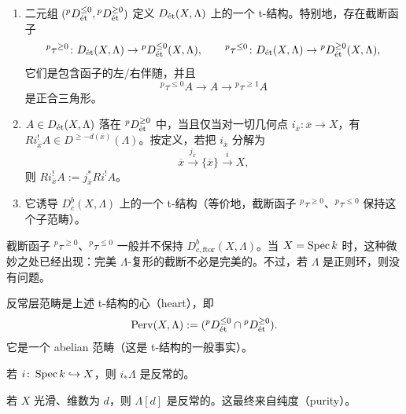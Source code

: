 \begin{theorem}
\begin{enumerate}[label=(\arabic*)]
\item 二元组 $({}^pD^{\le0}_\et,{}^pD^{\ge0}_\et)$ 定义 $D_\et(X,\Lambda)$ 上的一个 t-结构。特别地，存在截断函子
\[
{}^p\tau^{\ge0}\colon D_\et(X,\Lambda)\to{}^pD^{\le0}_\et(X,\Lambda),\qquad
{}^p\tau^{\le0}\colon D_\et(X,\Lambda)\to{}^pD^{\ge0}_\et(X,\Lambda),
\]
它们是包含函子的左/右伴随，并且
\[
{}^p\tau^{\le0}A\to A\to{}^p\tau^{\ge1}A
\]
是正合三角形。
\item $A\in D_\et(X,\Lambda)$ 落在 ${}^pD^{\ge0}_\et$ 中，当且仅当对一切几何点 $i_{\overline{x}}\colon\overline{x}\to X$，有 $Ri^!_{\overline{x}}A\in D^{\ge -d(\overline{x})}(\Lambda)$。按定义，若把 $i_{\overline{x}}$ 分解为
\[
\overline{x}\xrightarrow{j_{\overline{x}}}\{\overline{x}\}\xrightarrow{i}X,
\]
则 $Ri^!_{\overline{x}}A:=j^*_{\overline{x}}Ri^!A$。
\item 它诱导 $D^b_c(X,\Lambda)$ 上的一个 t-结构（等价地，截断函子 ${}^p\tau^{\ge0}$、${}^p\tau^{\le0}$ 保持这个子范畴）。
\end{enumerate}
\end{theorem}

\begin{warning}
截断函子 ${}^p\tau^{\ge0}$、${}^p\tau^{\le0}$ 一般并不保持 $D^b_{c,\mathrm{ftor}}(X,\Lambda)$。当 $X=\Spec k$ 时，这种微妙之处已经出现：完美 $\Lambda$-复形的截断不必是完美的。不过，若 $\Lambda$ 是正则环，则没有问题。
\end{warning}

\begin{definition}
反常层范畴是上述 t-结构的心（heart），即
\[
\Perv(X,\Lambda):=({}^pD^{\le0}_\et\cap{}^pD^{\ge0}_\et).
\]
它是一个 abelian 范畴（这是 t-结构的一般事实）。
\end{definition}

\begin{example}
若 $i\colon\Spec k\hookrightarrow X$，则 $i_*\Lambda$ 是反常的。
\end{example}

\begin{example}
若 $X$ 光滑、维数为 $d$，则 $\Lambda[d]$ 是反常的。这最终来自纯度（purity）。
\end{example}


